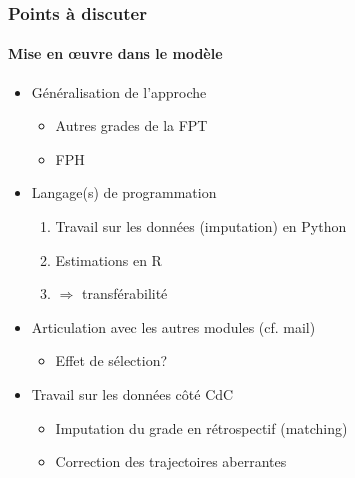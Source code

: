 \documentclass[xcolor=table,ignorenonframetext,12pt]{beamer}
\newenvironment{choixmarges}[2]{\begin{list}{}{%
\setlength{\topsep}{0pt}%
\setlength{\leftmargin}{0pt}%
\setlength{\rightmargin}{0pt}%
\setlength{\listparindent}{\parindent}%
\setlength{\itemindent}{\parindent}%
\setlength{\parsep}{0pt plus 1pt}%
\addtolength{\leftmargin}{#1}%
\addtolength{\rightmargin}{#2}%
}\item }{\end{list}}
\begin{document}
\begin{frame}
\frametitle{Points à discuter}
\framesubtitle{Mise en \oe uvre dans le modèle}

\begin{choixmarges}{-0.5cm}{-0.5cm}


\begin{itemize}

\item Généralisation de l'approche
	\begin{itemize}
	\item Autres grades de la FPT
	\item FPH
	\end{itemize}
	\vspace{0.2cm}
\item Langage(s) de programmation
	\begin{enumerate}
	\item Travail sur les données (imputation) en Python
	\item Estimations en R
	\item[] $\Rightarrow$ transférabilité
	\end{enumerate}
	\vspace{0.2cm}
\item Articulation avec les autres modules (cf. mail)
	\begin{itemize}
	\item Effet de sélection?
	\end{itemize}

\vspace{0.2cm}
\item Travail sur les données côté CdC
		\begin{itemize}
		\item Imputation du grade en rétrospectif (matching)
		\item Correction des trajectoires aberrantes 
		\end{itemize}

\end{itemize}





\end{choixmarges}
\end{frame}
\end{document}
